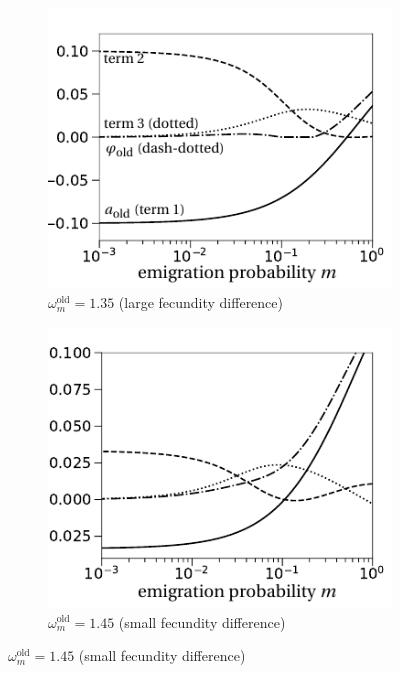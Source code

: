 \documentclass[a4paper,11pt]{scrartcl}
\begin{document}
\begin{figure}[t!]
\begin{subfigure}{.5\textwidth}
  		\includegraphics[width=\linewidth]{figS1c.pdf}
  		\caption{$\omega^\text{old}_m=1.35$ (large fecundity difference)}
	\end{subfigure}%
	\begin{subfigure}{.5\textwidth}
 		 \centering
 		 \includegraphics[width=\linewidth]{figS1d.pdf}
  	\caption{$\omega^\text{old}_m=1.45$ (small fecundity difference)}
	\end{subfigure}

\end{figure}
\end{document}
